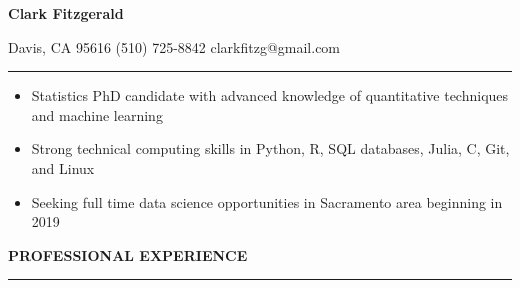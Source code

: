 \documentclass{article}
\begin{document}
\begin{center}
{\Large\bf Clark Fitzgerald} 
\end{center}

\hspace{4cm} Davis, CA 95616 \hspace{0.5cm} (510) 725-8842 \hspace{0.5cm} clarkfitzg@gmail.com 

\vspace{0.2cm}
\hrule
\vspace{0.2cm}

\begin{itemize}
  \setlength{\itemsep}{-1pt}

\item Statistics PhD candidate with advanced knowledge of quantitative
    techniques and machine learning
    
\item Strong technical computing skills in Python, R, SQL databases, Julia,
    C, Git, and Linux

\item Seeking full time data science opportunities in Sacramento area
    beginning in 2019

\end{itemize}

\vspace{0.1 cm}

\textbf{PROFESSIONAL EXPERIENCE}
\vspace{0.2 cm}
\hrule
\vspace{0.1cm}
\end{document}
